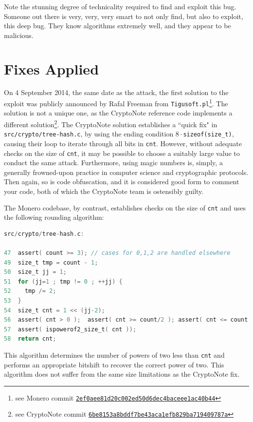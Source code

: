 \documentclass{mrl}
\begin{document}
Note the stunning degree of technicality required to find and exploit this bug. Someone out there is very, very, very smart to not only find, but also to exploit, this deep bug. They know algorithms extremely well, and they appear to be malicious.

\section{Fixes Applied}
On 4 September 2014, the same date as the attack, the first solution to the exploit was publicly announced by Rafal Freeman from \texttt{Tigusoft.pl}\footnote{see Monero commit \href{https://github.com/monero-project/bitmonero/commit/2ef0aee81d20c002ed50d6dec4baceee1ac40b44}{\nolinkurl{2ef0aee81d20c002ed50d6dec4baceee1ac40b44}}}. The solution is not a unique one, as the CryptoNote reference code implements a different solution\footnote{see CryptoNote commit \href{https://github.com/cryptonotefoundation/cryptonote/commit/6be8153a8bddf7be43aca1efb829ba719409787a}{\nolinkurl{6be8153a8bddf7be43aca1efb829ba719409787a}}}. The CryptoNote solution establishes a ``quick fix" in \texttt{src/crypto/tree-hash.c}, by using the ending condition \texttt{$8\cdot$sizeof(size\_t)}, causing their loop to iterate through all bits in \texttt{cnt}. However, without adequate checks on the size of \texttt{cnt}, it may be possible to choose a suitably large value to conduct the same attack. Furthermore, using magic numbers is, simply, a generally frowned-upon practice in computer science and cryptographic protocols. Then again, so is code obfuscation, and it is considered good form to comment your code, both of which the CryptoNote team is ostensibly guilty.

The Monero codebase, by contrast, establishes checks on the size of \texttt{cnt} and uses the following rounding algorithm:

\begin{lstlisting}[language=C]
src/crypto/tree-hash.c:

47  assert( count >= 3); // cases for 0,1,2 are handled elsewhere
49  size_t tmp = count - 1;
50  size_t jj = 1;
51  for (jj=1 ; tmp != 0 ; ++jj) {
52    tmp /= 2;
53  }
54  size_t cnt = 1 << (jj-2);
56  assert( cnt > 0 );	assert( cnt >= count/2 ); assert( cnt <= count );
57  assert( ispowerof2_size_t( cnt ));
58  return cnt;

\end{lstlisting}

This algorithm determines the number of powers of two less than \texttt{cnt} and performs an appropriate bitshift to recover the correct power of two. This algorithm does not suffer from the same size limitations as the CryptoNote fix.
\end{document}
